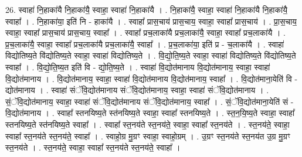 \documentclass[17pt]{extarticle}
\begin{document}
26. स्वाहा॑ नि॒हाका॑यै नि॒हाका॑यै॒ स्वाहा॒ स्वाहा॑ नि॒हाका॑यै । . नि॒हाका॑यै॒ स्वाहा॒ स्वाहा॑ नि॒हाका॑यै नि॒हाका॑यै॒ स्वाहा᳚ । . नि॒हाका॑या॒ इति॑ नि - हाका॑यै । . स्वाहा᳚ प्रास॒चाय॑ प्रास॒चाय॒ स्वाहा॒ स्वाहा᳚ प्रास॒चाय॑ । . प्रा॒स॒चाय॒ स्वाहा॒ स्वाहा᳚ प्रास॒चाय॑ प्रास॒चाय॒ स्वाहा᳚ । . स्वाहा᳚ प्रच॒लाका॑यै प्रच॒लाका॑यै॒ स्वाहा॒ स्वाहा᳚ प्रच॒लाका॑यै । . प्र॒च॒लाका॑यै॒ स्वाहा॒ स्वाहा᳚ प्रच॒लाका॑यै प्रच॒लाका॑यै॒ स्वाहा᳚ । . प्र॒च॒लाका॑या॒ इति॑ प्र - च॒लाका॑यै । . स्वाहा॑ विद्योतिष्य॒ते वि॑द्योतिष्य॒ते स्वाहा॒ स्वाहा॑ विद्योतिष्य॒ते । . वि॒द्यो॒ति॒ष्य॒ते स्वाहा॒ स्वाहा॑ विद्योतिष्य॒ते वि॑द्योतिष्य॒ते स्वाहा᳚ । . वि॒द्यो॒ति॒ष्य॒त इति॑ वि - द्यो॒ति॒ष्य॒ते । . स्वाहा॑ वि॒द्योत॑मानाय वि॒द्योत॑मानाय॒ स्वाहा॒ स्वाहा॑ वि॒द्योत॑मानाय । . वि॒द्योत॑मानाय॒ स्वाहा॒ स्वाहा॑ वि॒द्योत॑मानाय वि॒द्योत॑मानाय॒ स्वाहा᳚ । . वि॒द्योत॑माना॒येति॑ वि - द्योत॑मानाय । . स्वाहा॑ संॅवि॒द्योत॑मानाय संॅवि॒द्योत॑मानाय॒ स्वाहा॒ स्वाहा॑ संॅवि॒द्योत॑मानाय । . सं॒ॅवि॒द्योत॑मानाय॒ स्वाहा॒ स्वाहा॑ संॅवि॒द्योत॑मानाय संॅवि॒द्योत॑मानाय॒ स्वाहा᳚ । . सं॒ॅवि॒द्योत॑माना॒येति॑ सं - वि॒द्योत॑मानाय । . स्वाहा᳚ स्तनयिष्य॒ते स्त॑नयिष्य॒ते स्वाहा॒ स्वाहा᳚ स्तनयिष्य॒ते । . स्त॒न॒यि॒ष्य॒ते स्वाहा॒ स्वाहा᳚ स्तनयिष्य॒ते स्त॑नयिष्य॒ते स्वाहा᳚ । . स्वाहा᳚ स्त॒नय॑ते स्त॒नय॑ते॒ स्वाहा॒ स्वाहा᳚ स्त॒नय॑ते । . स्त॒नय॑ते॒ स्वाहा॒ स्वाहा᳚ स्त॒नय॑ते स्त॒नय॑ते॒ स्वाहा᳚ । . स्वाहो॒ग्र मु॒ग्रꣳ स्वाहा॒ स्वाहो॒ग्रम् । . उ॒ग्रꣳ स्त॒नय॑ते स्त॒नय॑त उ॒ग्र मु॒ग्रꣳ स्त॒नय॑ते । . स्त॒नय॑ते॒ स्वाहा॒ स्वाहा᳚ स्त॒नय॑ते स्त॒नय॑ते॒ स्वाहा᳚ । \newline
\end{document}
